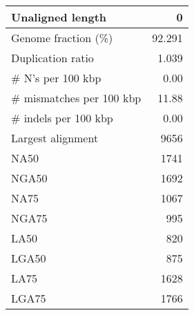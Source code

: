 \documentclass[12pt,a4paper]{article}
\begin{document}
\begin{table}[ht]
\begin{center}
\begin{tabular}{|l*{1}{|r}|}
Unaligned length & 0 \\ \hline
Genome fraction (\%) & 92.291 \\ \hline
Duplication ratio & 1.039 \\ \hline
\# N's per 100 kbp & 0.00 \\ \hline
\# mismatches per 100 kbp & 11.88 \\ \hline
\# indels per 100 kbp & 0.00 \\ \hline
Largest alignment & 9656 \\ \hline
NA50 & 1741 \\ \hline
NGA50 & 1692 \\ \hline
NA75 & 1067 \\ \hline
NGA75 & 995 \\ \hline
LA50 & 820 \\ \hline
LGA50 & 875 \\ \hline
LA75 & 1628 \\ \hline
LGA75 & 1766 \\ \hline
\end{tabular}
\end{center}
\end{table}
\end{document}
